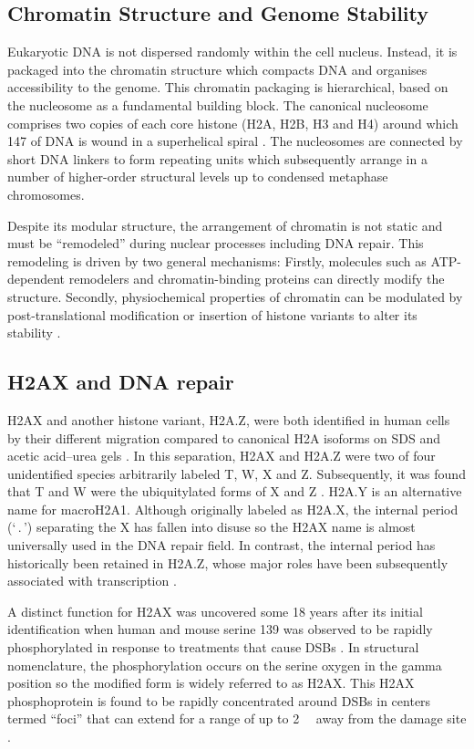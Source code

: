 \subsection{Chromatin Structure and Genome Stability}
Eukaryotic DNA is not dispersed randomly within the cell
nucleus. Instead, it is packaged into the chromatin structure which
compacts DNA and organises accessibility to the genome. This chromatin
packaging is hierarchical, based on the nucleosome as a fundamental
building block. The canonical nucleosome comprises two copies of each
core histone (H2A, H2B, H3 and H4) around which \SI{147}{\bp} of DNA is
wound in a superhelical spiral \citep{CAD+02}. The nucleosomes are
connected by short DNA linkers to form repeating units which
subsequently arrange in a number of higher-order structural levels up
to condensed metaphase chromosomes.

Despite its modular structure, the arrangement of chromatin is not
static and must be ``remodeled'' during nuclear processes including
DNA repair. This remodeling is driven by two general mechanisms:
Firstly, molecules such as ATP-dependent remodelers and
chromatin-binding proteins can directly modify the
structure. Secondly, physiochemical properties of chromatin can be
modulated by post-translational modification or insertion of histone
variants to alter its stability \citep{GFMG03,JA06}.

\subsection{H2AX and DNA repair}
H2AX and another histone variant, H2A.Z, were both identified in human
cells by their different migration compared to canonical H2A isoforms
on SDS and acetic acid--urea gels \citep{MHPW80}. In this separation,
H2AX and H2A.Z were two of four unidentified species arbitrarily
labeled T, W, X and Z\@. Subsequently, it was found that T and W were
the ubiquitylated forms of X and Z \citep{MHPW80}.
H2A.Y is an alternative name for macroH2A1. Although originally
labeled as H2A.X, the internal period (`\,.\,') separating the X has
fallen into disuse so the H2AX name is almost universally used in the
DNA repair field. In contrast, the internal period has historically
been retained in H2A.Z, whose major roles have been subsequently
associated with transcription \citep{JA06}.

A distinct function for H2AX was uncovered some 18 years after its
initial identification when human and mouse serine 139 was observed to
be rapidly phosphorylated in response to treatments that cause DSBs
\citep{EPR+98}. In structural nomenclature, the phosphorylation occurs
on the serine oxygen in the gamma position so the modified form is
widely referred to as \textgamma H2AX\@. This \textgamma H2AX
phosphoprotein is found to be rapidly concentrated around DSBs in
centers termed ``foci'' that can extend for a range of up to
\SI{2}{\mega\bp} away from the damage site \citep{EPR+99}.


